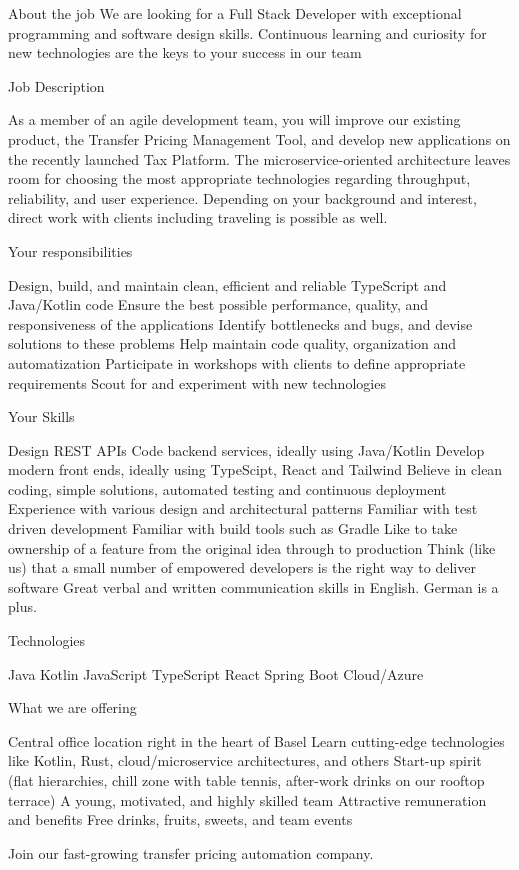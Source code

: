 About the job
We are looking for a Full Stack Developer with exceptional programming and software design skills. Continuous learning and curiosity for new technologies are the keys to your success in our team



Job Description

As a member of an agile development team, you will improve our existing product, the Transfer Pricing Management Tool, and develop new applications on the recently launched Tax Platform. The microservice-oriented architecture leaves room for choosing the most appropriate technologies regarding throughput, reliability, and user experience. Depending on your background and interest, direct work with clients including traveling is possible as well.



Your responsibilities

Design, build, and maintain clean, efficient and reliable TypeScript and Java/Kotlin code
Ensure the best possible performance, quality, and responsiveness of the applications
Identify bottlenecks and bugs, and devise solutions to these problems
Help maintain code quality, organization and automatization
Participate in workshops with clients to define appropriate requirements
Scout for and experiment with new technologies


Your Skills

Design REST APIs
Code backend services, ideally using Java/Kotlin
Develop modern front ends, ideally using TypeScipt, React and Tailwind
Believe in clean coding, simple solutions, automated testing and continuous deployment
Experience with various design and architectural patterns
Familiar with test driven development
Familiar with build tools such as Gradle
Like to take ownership of a feature from the original idea through to production
Think (like us) that a small number of empowered developers is the right way to deliver software
Great verbal and written communication skills in English. German is a plus.


Technologies

Java
Kotlin
JavaScript
TypeScript
React
Spring Boot
Cloud/Azure


What we are offering

Central office location right in the heart of Basel
Learn cutting-edge technologies like Kotlin, Rust, cloud/microservice architectures, and others
Start-up spirit (flat hierarchies, chill zone with table tennis, after-work drinks on our rooftop terrace)
A young, motivated, and highly skilled team
Attractive remuneration and benefits
Free drinks, fruits, sweets, and team events


Join our fast-growing transfer pricing automation company.


